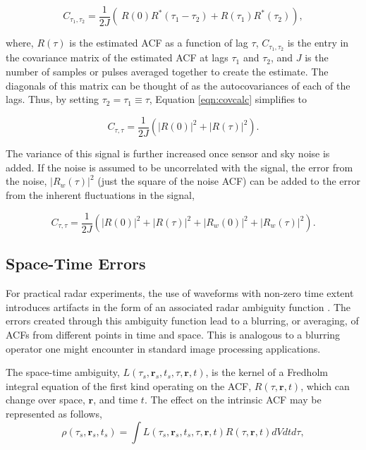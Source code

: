 \documentclass[draft,ras]{agutex}
\begin{document}
\begin{article}
\begin{equation}
\label{eqn:covcalc}
C_{\tau_1,\tau_2} = \frac{1}{2J} \left( \ R(0)  R^*(\tau_1-\tau_2) +  R(\tau_1) R^*(\tau_2) \right),
\end{equation}

\noindent where, $R(\tau)$ is the estimated ACF as a function of lag $\tau$, $C_{\tau_1,\tau_2}$ is the entry in the covariance matrix of the estimated ACF at lags $\tau_1$ and $\tau_2$,  and $J$ is the number of samples or pulses averaged together to create the estimate. The diagonals of this matrix can be thought of as the autocovariances of each of the lags.  Thus, by setting $\tau_2 = \tau_1 \equiv \tau$, Equation \ref{eqn:covcalc} simplifies to

\begin{equation}
\label{eqn:covdiag}
C_{\tau,\tau} = \frac{1}{2J} \left(  |R(0)|^2 +|R(\tau)|^2\right).
\end{equation}

The variance of this signal is further increased once sensor and sky noise is added.  If the noise is assumed to be uncorrelated with the signal, the error from the noise, $\left|R_w (\tau)\right|^2$ (just the square of the noise ACF) can be added to the error from the inherent fluctuations in the signal,

\begin{equation}
\label{eqn:covdiagwn}
C_{\tau,\tau} = \frac{1}{2J} \left(  |R(0)|^2 +|R(\tau)|^2 + \left|R_w (0)\right|^2+\left|R_w (\tau)\right|^2\right).
\end{equation}

\subsection{Space-Time Errors}

For practical radar experiments, the use of waveforms with non-zero time extent introduces artifacts in the form of an associated radar ambiguity function \citep{nygren1996}.  The errors created through this ambiguity function lead to a blurring, or averaging, of ACFs from different points in time and space. This is analogous to a blurring operator one might encounter in standard image processing applications.
 
The space-time ambiguity, $L(\tau_s,\mathbf{r}_s,t_s,\tau,\mathbf{r},t)$, is the kernel of a Fredholm integral equation of the first kind operating on the ACF, $R(\tau,\mathbf{r},t)$, which can change over space, $\mathbf{r}$, and time $t$. The effect on the intrinsic ACF may be represented as follows,
 \begin{equation}
  \label{eqn:staf}
  \rho(\tau_s,\mathbf{r}_s,t_s) =\int L(\tau_s,\mathbf{r}_s,t_s,\tau,\mathbf{r},t)R(\tau,\mathbf{r},t)dVdtd\tau,
\end{equation}


\end{article}
\end{document}
